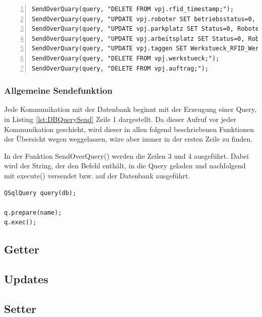 \begin{lstlisting}[frame=single, breaklines=true, numbers=left, stepnumber=2, firstnumber=1, numberstyle = \tiny, caption=Databank-Handler Initialisierung ,label=lst:DBInit]
SendOverQuary(query, "DELETE FROM vpj.rfid_timestamp;");
SendOverQuary(query, "UPDATE vpj.roboter SET betriebsstatus=0, Werkstueck_RFID_Werkstueck=NULL;");
SendOverQuary(query, "UPDATE vpj.parkplatz SET Status=0, Roboter_id_Roboter=NULL;");
SendOverQuary(query, "UPDATE vpj.arbeitsplatz SET Status=0, Roboter_id_Roboter=NULL, Werkstueck_RFID_Werkstueck=NULL;");
SendOverQuary(query, "UPDATE vpj.taggen SET Werkstueck_RFID_Werkstueck=NULL WHERE id_taggen=1;");
SendOverQuary(query, "DELETE FROM vpj.werkstueck;");
SendOverQuary(query, "DELETE FROM vpj.auftrag;");
\end{lstlisting}

\subsubsection{Allgemeine Sendefunktion}

Jede Kommunikation mit der Datenbank beginnt mit der Erzeugung einer Query, in Listing \ref{lst:DBQuerySend} Zeile 1 dargestellt. Da dieser Aufruf vor jeder Kommunikation geschieht, wird dieser in allen folgend beschriebenen Funktionen der Übersicht wegen weggelassen, wäre aber immer in der ersten Zeile zu finden.

In der Funktion SendOverQuery() werden die Zeilen 3 und 4 ausgeführt. Dabei wird der String, der den Befehl enthält, in die Query geladen und nachfolgend mit execute() versendet bzw. auf der Datenbank ausgeführt. 

\begin{lstlisting}[frame=single, breaklines=true, caption=Databank-Handler Senden über Query ,label=lst:DBQuerySend]
QSqlQuery query(db);

q.prepare(name);
q.exec();
\end{lstlisting}

\subsection{Getter}
\inlinetodo{}
\subsection{Updates}
\inlinetodo{}
\subsection{Setter}
\inlinetodo{}

